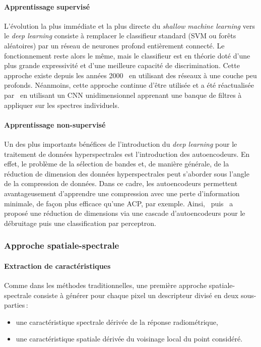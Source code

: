 \paragraph{Apprentissage supervisé} L'évolution la plus immédiate et la plus directe du \textit{shallow machine learning} vers le \textit{deep learning} consiste à remplacer le classifieur standard (SVM ou forêts aléatoires) par un réseau de neurones profond entièrement connecté. Le fonctionnement reste alors le même, mais le classifieur est en théorie doté d'une plus grande expressivité et d'une meilleure capacité de discrimination. Cette approche existe depuis les années 2000~\cite{goel_classification_2003,ratle_semisupervised_2010} en utilisant des réseaux à une couche peu profonds. Néanmoins, cette approche continue d'être utilisée et a été réactualisée par~\cite{hu_deep_2015} en utilisant un CNN unidimensionnel apprenant une banque de filtres à appliquer sur les spectres individuels.

\paragraph{Apprentissage non-supervisé} Un des plus importants bénéfices de l'introduction du \textit{deep learning} pour le traitement de données hyperspectrales est l'introduction des autoencodeurs. En effet, le problème de la sélection de bandes et, de manière générale, de la réduction de dimension des données hyperspectrales peut s'aborder sous l'angle de la compression de données. Dans ce cadre, les autoencodeurs permettent avantageusement d'apprendre une compression avec une perte d'information minimale, de façon plus efficace qu'une ACP, par exemple. Ainsi,~\cite{xing_stacked_2015} puis~\cite{fu_semi-supervised_2016} a proposé une réduction de dimensions via une cascade d'autoencodeurs pour le débruitage puis une classification par perceptron.

\subsubsection{Approche spatiale-spectrale}

\paragraph{Extraction de caractéristiques} Comme dans les méthodes traditionnelles, une première approche spatiale-spectrale consiste à générer pour chaque pixel un descripteur divisé en deux sous-parties\,:
\begin{itemize}
	\item une caractéristique spectrale dérivée de la réponse radiométrique,
  \item une caractéristique spatiale dérivée du voisinage local du point considéré.
\end{itemize}

